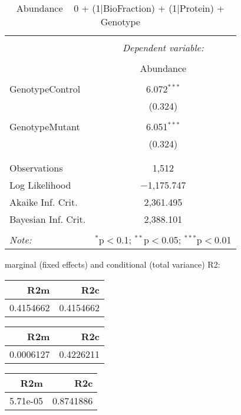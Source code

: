 \documentclass[11pt]{report}
\begin{document}
\begin{table}[!htbp] \centering 
  \caption{Abundance ~ 0 + (1|BioFraction) + (1|Protein) + Genotype} 
  \label{} 
\begin{tabular}{@{\extracolsep{5pt}}lc} 
\\[-1.8ex]\hline 
\hline \\[-1.8ex] 
 & \multicolumn{1}{c}{\textit{Dependent variable:}} \\ 
\cline{2-2} 
\\[-1.8ex] & Abundance \\ 
\hline \\[-1.8ex] 
 GenotypeControl & 6.072$^{***}$ \\ 
  & (0.324) \\ 
  & \\ 
 GenotypeMutant & 6.051$^{***}$ \\ 
  & (0.324) \\ 
  & \\ 
\hline \\[-1.8ex] 
Observations & 1,512 \\ 
Log Likelihood & $-$1,175.747 \\ 
Akaike Inf. Crit. & 2,361.495 \\ 
Bayesian Inf. Crit. & 2,388.101 \\ 
\hline 
\hline \\[-1.8ex] 
\textit{Note:}  & \multicolumn{1}{r}{$^{*}$p$<$0.1; $^{**}$p$<$0.05; $^{***}$p$<$0.01} \\ 
\end{tabular} 
\end{table} 
marginal (fixed effects) and conditional (total variance) R2:

\begin{tabular}{r|r}
\hline
R2m & R2c\\
\hline
0.4154662 & 0.4154662\\
\hline
\end{tabular}

\begin{tabular}{r|r}
\hline
R2m & R2c\\
\hline
0.0006127 & 0.4226211\\
\hline
\end{tabular}

\begin{tabular}{r|r}
\hline
R2m & R2c\\
\hline
5.71e-05 & 0.8741886\\
\hline
\end{tabular}
\end{document}
